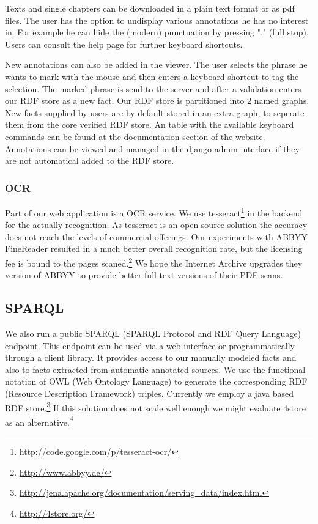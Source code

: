 \documentclass[12pt, draft]{article}
\begin{document}
Texts and single chapters can be downloaded in a plain text format or as pdf files.
The user has the option to undisplay various annotations he has no interest in. For example
he can hide the (modern) punctuation by pressing "." (full stop).  Users can consult the
help page for further keyboard shortcuts.

New annotations can also be added in the viewer. The user selects the phrase he wants
to mark with the mouse and then enters a keyboard shortcut to tag the selection.
The marked phrase is send to the server and after a validation enters
our RDF store as a new fact.  Our RDF store is partitioned into 2 named graphs.
New facts supplied by users are by default stored in an extra graph, to seperate them
from the core verified RDF store.  An table with the available keyboard commands
can be found at the documentation section of the website.
Annotations can be viewed and managed in the django admin interface if they are not
automatical added to the RDF store.

\subsubsection{OCR}

Part of our web application is a OCR service.  We use tesseract\footnote{\url{http://code.google.com/p/tesseract-ocr/}}
 in the backend for the
actually recognition.  As tesseract is an open source solution the accuracy does not
reach the levels of commercial offerings.  Our experiments with ABBYY FineReader
resulted in a much better overall recognition rate, but the licensing fee is bound
to the pages scaned.\footnote{\url{http://www.abbyy.de/}}
We hope the Internet Archive upgrades they version of ABBYY to provide better full text
versions of their PDF scans.

\subsection{SPARQL}

We also run a public SPARQL (SPARQL Protocol and RDF Query Language) endpoint.
This endpoint can be used via a web interface or programmatically through
a client library.  It provides access to our manually modeled facts
and also to facts extracted from automatic annotated sources.
We use the functional notation of OWL (Web Ontology Language) to generate
the corresponding RDF (Resource Description Framework) triples.
Currently we employ a java based RDF store.\footnote{\url{http://jena.apache.org/documentation/serving_data/index.html}}
If this solution does not scale well enough we might evaluate
4store as an alternative.\footnote{\url{http://4store.org/}}
\end{document}
